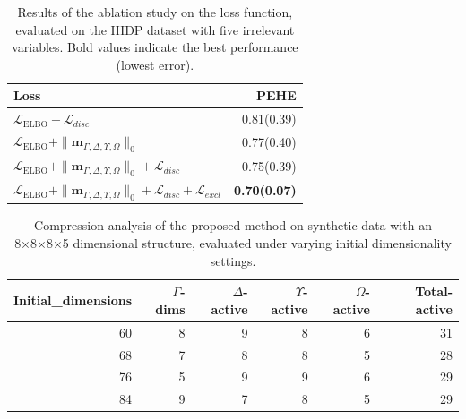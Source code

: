 \documentclass[doubleblind]{ecai}
\begin{document}
	
	
	\begin{table}
		\centering
		\caption{Results of the ablation study on the loss function, evaluated on the IHDP dataset with five irrelevant variables. Bold values indicate the best performance (lowest error).}
		\small
		\begin{tabular}{lr}
			\toprule
			Loss & PEHE \\
			\midrule
			
			
			
			$\mathcal{L}_{\text{ELBO}} + \mathcal{L}_{disc}$ 		& 0.81(0.39)    	       \\
			$\mathcal{L}_{\text{ELBO}} + \|\mathbf{m}_{\Gamma, \Delta, \Upsilon,\Omega}\|_0$   	& 0.77(0.40)           \\
			$\mathcal{L}_{\text{ELBO}} + \|\mathbf{m}_{\Gamma, \Delta, \Upsilon,\Omega}\|_0 + \mathcal{L}_{disc}$     	& 0.75(0.39)                \\
			$\mathcal{L}_{\text{ELBO}} + \|\mathbf{m}_{\Gamma, \Delta, \Upsilon,\Omega}\|_0 + \mathcal{L}_{disc}+\mathcal{L}_{\mathit{excl}}$    	& \textbf{0.70(0.07) }               \\
			
			\bottomrule
		\end{tabular}
		
		\label{tab:ablation}
		
	\end{table}
	
	
	\begin{table}[h]
		\addtolength{\tabcolsep}{-0.5em}
		\centering
		\caption{Compression analysis of the proposed method on synthetic data with an 8×8×8×5 dimensional structure, evaluated under varying initial dimensionality settings. }
		\small
		\begin{tabular}{rrrrrr}
			\toprule
			Initial\_dimensions& $\Gamma$-dims & $\Delta$-active & $\Upsilon$-active & $\Omega$-active & Total-active \\
			\midrule
			
			60         	& 8 & 9      & 8   & 6            & 31            \\
			68         	& 7 & 8      & 8  & 5            & 28            \\
			76         	& 5 & 9      & 9   & 6          & 29            \\
			84         	& 9 & 7      & 8    & 5          & 29            \\
			
			
			\bottomrule
		\end{tabular}
		
		\label{tab:compression}
	\end{table}
	
\end{document}
